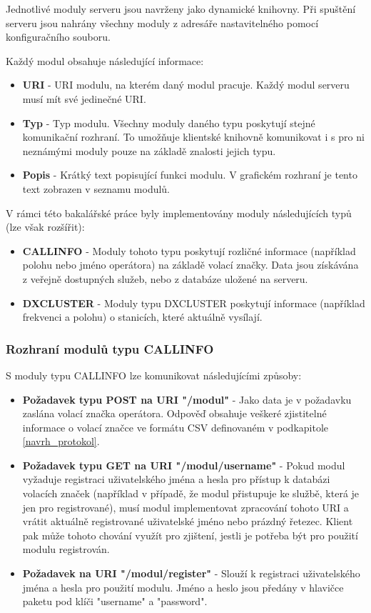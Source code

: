 Jednotlivé moduly serveru jsou navrženy jako dynamické knihovny.
Při spuštění serveru jsou nahrány všechny moduly z adresáře nastavitelného pomocí konfiguračního souboru.

Každý modul obsahuje následující informace:

\begin{itemize}
\item \textbf{URI} - URI modulu, na kterém daný modul pracuje. Každý modul serveru musí mít své jedinečné URI.
\item \textbf{Typ} - Typ modulu. Všechny moduly daného typu poskytují stejné komunikační rozhraní. To umožňuje klientské knihovně
komunikovat i s pro ni neznámými moduly pouze na základě znalosti jejich typu.
\item \textbf{Popis} - Krátký text popisující funkci modulu. V grafickém rozhraní je tento text zobrazen v seznamu modulů.
\end{itemize}

V rámci této bakalářské práce byly implementovány moduly následujících typů (lze
však rozšířit):

\begin{itemize}
\item \textbf{CALLINFO} - Moduly tohoto typu poskytují rozličné informace (například polohu nebo jméno operátora)
na základě volací značky. Data jsou získávána z veřejně dostupných služeb, nebo z databáze uložené na serveru.
\item \textbf{DXCLUSTER} - Moduly typu DXCLUSTER poskytují informace (například frekvenci a polohu) o stanicích,
které aktuálně vysílají.
\end{itemize}

\subsubsection{Rozhraní modulů typu CALLINFO}

S moduly typu CALLINFO lze komunikovat následujícími způsoby:

\begin{itemize}
\item \textbf{Požadavek typu POST na URI "/modul"} - %
Jako data je v požadavku zaslána volací značka operátora. Odpověď obsahuje
veškeré zjistitelné informace o volací značce ve formátu CSV definovaném v podkapitole \ref{navrh_protokol}.
\item \textbf{Požadavek typu GET na URI "/modul/username"} - %
Pokud modul vyžaduje registraci uživatelského jména a hesla pro
přístup k databázi volacích značek (například v případě, že modul přistupuje ke službě, která je jen pro registrované), musí modul
implementovat zpracování tohoto URI a vrátit aktuálně registrované uživatelské jméno nebo prázdný řetezec. Klient pak může tohoto
chování využít pro zjištení, jestli je potřeba být pro použití modulu registrován.
\item \textbf{Požadavek na URI "/modul/register"} - Slouží k registraci uživatelského jména a hesla pro použití modulu.
Jméno a heslo jsou předány v hlavičce paketu pod klíči "username" a "password".
\end{itemize}

